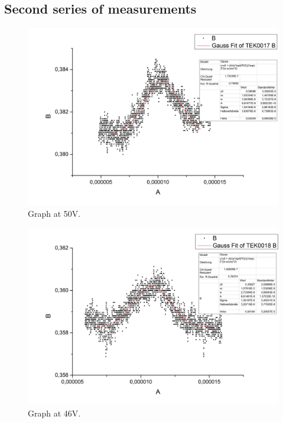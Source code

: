 \subsection*{Second series of measurements}
\begin{figure}[h]
\begin{center}
\includegraphics[scale=0.25]{Bilder/Teil2/21}
\caption{Graph at 50V.}
\label{fig:21}
\end{center}
\end{figure}
\begin{figure}[h]
\begin{center}
\includegraphics[scale=0.25]{Bilder/Teil2/22}
\caption{Graph at 46V.}
\label{fig:22}
\end{center}
\end{figure}
